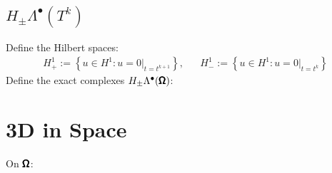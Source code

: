         \subsection*{$H_{\pm}\Lambda^{\bullet}\left(T^{k}\right)$}
            Define the Hilbert spaces:
            \begin{align}
                H^{1}_{+}  :=  \left\{u \in H^{1} : u = 0|_{t = t^{k + 1}}\right\},  &&
                H^{1}_{-}  :=  \left\{u \in H^{1} : u = 0|_{t = t^{k}}\right\}
            \end{align}
            Define the exact complexes $H_{\pm}\Lambda^{\bullet}(\pmb{\mathsf{\Omega}})$:
            \begin{center}\end{center}
        
    \section{3D in Space}
        On $\pmb{\mathsf{\Omega}}$:

